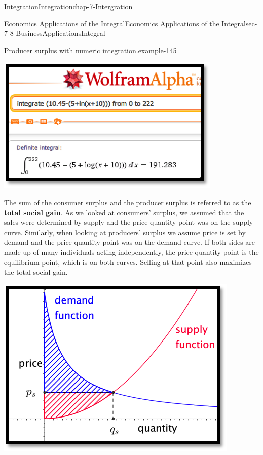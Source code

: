 \documentclass[oneside,10pt,]{book}
\newcommand{\terminology}[1]{\textbf{#1}}
\numberwithin{equation}{section}
\begin{document}
\begin{chapterptx}{Integration}{}{Integration}{}{}{chap-7-Intergration}
\begin{sectionptx}{Economics Applications of the Integral}{}{Economics Applications of the Integral}{}{}{sec-7-8-BusinessApplicationsIntegral}
\begin{example}{Producer surplus with numeric integration.}{example-145}
\begin{sidebyside}{1}{0.3}{0.3}{0}
\begin{sbspanel}{0.4}
\includegraphics[width=1\linewidth]{images/sec7-8-7.png}
\end{sbspanel}%
\end{sidebyside}%
\end{example}
\hypertarget{p-3098}{}%
The sum of the consumer surplus and the producer surplus is referred to as the \terminology{total social gain}.   As we looked at consumers' surplus, we assumed that the sales were determined by supply and the price-quantity point was on the supply curve.  Similarly, when looking at producers' surplus we assume price is set by demand and the price-quantity point was on the demand curve.  If both sides are made up of many individuals acting independently, the price-quantity point is the equilibrium point, which is on both curves.  Selling at that point also maximizes the total social gain.%
\begin{sidebyside}{1}{0.2}{0.2}{0}%
\begin{sbspanel}{0.6}%
\includegraphics[width=1\linewidth]{images/sec7-8-8.png}

\end{sbspanel}
\end{sidebyside}
\end{sectionptx}
\end{chapterptx}
\end{document}
